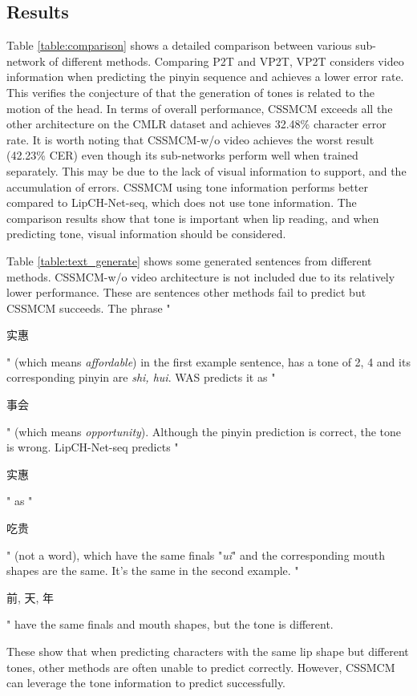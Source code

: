 \documentclass[sigconf]{acmart}
\begin{document}
\subsection{Results}
Table \ref{table:comparison} shows a detailed comparison between various sub-network of different methods. Comparing P2T and VP2T, VP2T considers video information when predicting the pinyin sequence and achieves a lower error rate. This verifies the conjecture of \cite{chen2008seeing} that the generation of tones is related to the motion of the head. In terms of overall performance, CSSMCM exceeds all the other architecture on the CMLR dataset and achieves 32.48\% character error rate. It is worth noting that CSSMCM-w/o video achieves the worst result (42.23\% CER) even though its sub-networks perform well when trained separately. This may be due to the lack of visual information to support, and the accumulation of errors. CSSMCM using tone information performs better compared to LipCH-Net-seq, which does not use tone information. The comparison results show that tone is important when lip reading, and when predicting tone, visual information should be considered.

Table \ref{table:text_generate} shows some generated sentences from different methods. CSSMCM-w/o video architecture is not included due to its relatively lower performance. These are sentences other methods fail to predict but CSSMCM succeeds. The phrase "\begin{CJK*}{UTF8}{gbsn}实惠\end{CJK*}" (which means \textit{affordable}) in the first example sentence, has a tone of 2, 4 and its corresponding pinyin are \textit{shi, hui}. WAS predicts it as "\begin{CJK*}{UTF8}{gbsn}事会\end{CJK*}" (which means \textit{opportunity}). Although the pinyin prediction is correct, the tone is wrong. LipCH-Net-seq predicts "\begin{CJK*}{UTF8}{gbsn}实惠\end{CJK*}" as "\begin{CJK*}{UTF8}{gbsn}吃贵\end{CJK*}" (not a word), which have the same finals "\textit{ui}" and the corresponding mouth shapes are the same. It's the same in the second example. "\begin{CJK*}{UTF8}{gbsn}前, 天, 年\end{CJK*}" have the same finals and mouth shapes, but the tone is different. 

These show that when predicting characters with the same lip shape but different tones, other methods are often unable to predict correctly. However, CSSMCM can leverage the tone information to predict successfully.
\end{document}
